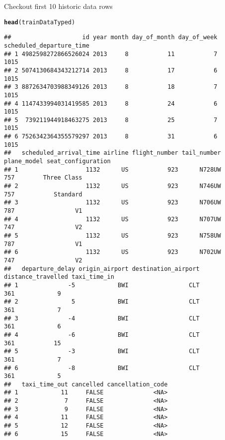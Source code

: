 \documentclass{article}\usepackage[]{graphicx}\usepackage[]{color}
\makeatletter
\newcommand{\hlstd}[1]{\textcolor[rgb]{0.345,0.345,0.345}{#1}}%
\newcommand{\hlkwd}[1]{\textcolor[rgb]{0.737,0.353,0.396}{\textbf{#1}}}%
\newenvironment{kframe}{%
 \def\at@end@of@kframe{}%
 \ifinner\ifhmode%
  \def\at@end@of@kframe{\end{minipage}}%
  \begin{minipage}{\columnwidth}%
 \fi\fi%
 \def\FrameCommand##1{\hskip\@totalleftmargin \hskip-\fboxsep
 \colorbox{shadecolor}{##1}\hskip-\fboxsep
     \hskip-\linewidth \hskip-\@totalleftmargin \hskip\columnwidth}%
 \MakeFramed {\advance\hsize-\width
   \@totalleftmargin\z@ \linewidth\hsize
   \@setminipage}}%
 {\par\unskip\endMakeFramed%
 \at@end@of@kframe}
\newenvironment{knitrout}{}{} %
\makeatother
\begin{document}
Checkout first 10 historic data rows
\begin{knitrout}
\color{fgcolor}\begin{kframe}
\begin{alltt}
\hlkwd{head}\hlstd{(trainDataTyped)}
\end{alltt}
\begin{verbatim}
##                    id year month day_of_month day_of_week scheduled_departure_time
## 1 4982598272866526024 2013     8           11           7                     1015
## 2 5074130684343212714 2013     8           17           6                     1015
## 3 8872634703988349126 2013     8           18           7                     1015
## 4 1147433994031419585 2013     8           24           6                     1015
## 5  739211944918463275 2013     8           25           7                     1015
## 6 7526342364355579297 2013     8           31           6                     1015
##   scheduled_arrival_time airline flight_number tail_number plane_model seat_configuration
## 1                   1132      US           923      N728UW         757        Three Class
## 2                   1132      US           923      N746UW         757           Standard
## 3                   1132      US           923      N706UW         787                 V1
## 4                   1132      US           923      N707UW         747                 V2
## 5                   1132      US           923      N758UW         787                 V1
## 6                   1132      US           923      N702UW         747                 V2
##   departure_delay origin_airport destination_airport distance_travelled taxi_time_in
## 1              -5            BWI                 CLT                361            9
## 2               5            BWI                 CLT                361            7
## 3              -4            BWI                 CLT                361            6
## 4              -6            BWI                 CLT                361           15
## 5              -3            BWI                 CLT                361            7
## 6              -8            BWI                 CLT                361            5
##   taxi_time_out cancelled cancellation_code
## 1            11     FALSE              <NA>
## 2             7     FALSE              <NA>
## 3             9     FALSE              <NA>
## 4            11     FALSE              <NA>
## 5            12     FALSE              <NA>
## 6            15     FALSE              <NA>
\end{verbatim}
\end{kframe}
\end{knitrout}
\end{document}
